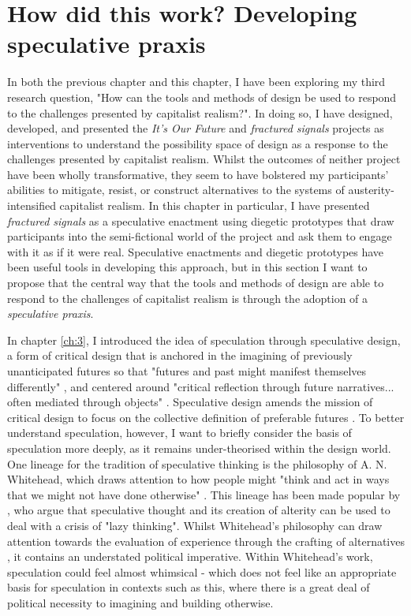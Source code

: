 \section{How did this work? Developing speculative praxis}

In both the previous chapter and this chapter, I have been exploring my third research question, "How can the tools and methods of design be used to respond to the challenges presented by capitalist realism?". In doing so, I have designed, developed, and presented the \textit{It's Our Future} and \textit{fractured signals} projects as interventions to understand the possibility space of design as a response to the challenges presented by capitalist realism. Whilst the outcomes of neither project have been wholly transformative, they seem to have bolstered my participants' abilities to mitigate, resist, or construct alternatives to the systems of austerity-intensified capitalist realism. In this chapter in particular, I have presented \textit{fractured signals} as a speculative enactment using diegetic prototypes that draw participants into the semi-fictional world of the project and ask them to engage with it as if it were real. Speculative enactments and diegetic prototypes have been useful tools in developing this approach, but in this section I want to propose that the central way that the tools and methods of design are able to respond to the challenges of capitalist realism is through the adoption of a \textit{speculative praxis}.

In chapter \ref{ch:3}, I introduced the idea of speculation through speculative design, a form of critical design that is anchored in the imagining of previously unanticipated futures so that "futures and past might manifest themselves differently" \citep[p. 1]{gatehouse_hauntology_2020}, and centered around "critical reflection through future narratives... often mediated through objects" \citep{forlano_ethnographies_2013}. Speculative design amends the mission of critical design to focus on the collective definition of preferable futures \cite[p. 6]{dunne_speculative_2013}. To better understand speculation, however, I want to briefly consider the basis of speculation more deeply, as it remains under-theorised within the design world. One lineage for the tradition of speculative thinking is the philosophy of A. N. Whitehead, which draws attention to how people might "think and act in ways that we might not have done otherwise" \citep[p. 2]{shaviro_defining_2019}. This lineage has been made popular by \citet[p. 14]{debaise_insistence_2016}, who argue that speculative thought and its creation of alterity can be used to deal with a crisis of "lazy thinking". Whilst Whitehead's philosophy can draw attention towards the evaluation of experience through the crafting of alternatives \citep[p. 2]{williams_abstract_2022}, it contains an understated political imperative. Within Whitehead's work, speculation could feel almost whimsical - which does not feel like an appropriate basis for speculation in contexts such as this, where there is a great deal of political necessity to imagining and building otherwise. 

